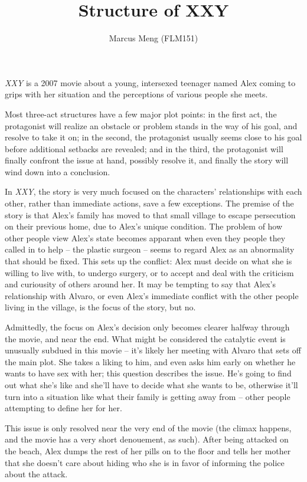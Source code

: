 \documentclass{article}
\title{Structure of XXY}
\author{Marcus Meng (FLM151)}
\begin{document}
\maketitle

\emph{XXY} is a 2007 movie about a young, intersexed teenager named Alex coming to grips with her situation and the perceptions of various people she meets.

Most three-act structures have a few major plot points: in the first act, the protagonist will realize an obstacle or problem stands in the way of his goal, and resolve to take it on;
in the second, the protagonist usually seems close to his goal before additional setbacks are revealed;
and in the third, the protagonist will finally confront the issue at hand, possibly resolve it, and finally the story will wind down into a conclusion.

In \emph{XXY}, the story is very much focused on the characters' relationships with each other, rather than immediate actions, save a few exceptions.
The premise of the story is that Alex's family has moved to that small village to escape persecution on their previous home, due to Alex's unique condition.
The problem of how other people view Alex's state becomes apparant when even they people they called in to help -- the plastic surgeon -- seems to regard Alex as an abnormality that should be fixed.
This sets up the conflict: Alex must decide on what she is willing to live with, to undergo surgery, or to accept and deal with the criticism and curiousity of others around her.
It may be tempting to say that Alex's relationship with Alvaro, or even Alex's immediate conflict with the other people living in the village, is the focus of the story, but no.

Admittedly, the focus on Alex's decision only becomes clearer halfway through the movie, and near the end.
What might be considered the catalytic event is unusually subdued in this movie -- it's likely her meeting with Alvaro that sets off the main plot.
She takes a liking to him, and even asks him early on whether he wants to have sex with her;
this question describes the issue.
He's going to find out what she's like and she'll have to decide what she wants to be, otherwise it'll turn into a situation like what their family is getting away from -- other people attempting to define her for her.

This issue is only resolved near the very end of the movie (the climax happens, and the movie has a very short denouement, as such).
After being attacked on the beach, Alex dumps the rest of her pills on to the floor and tells her mother that she doesn't care about hiding who she is in favor of informing the police about the attack.
\end{document}
